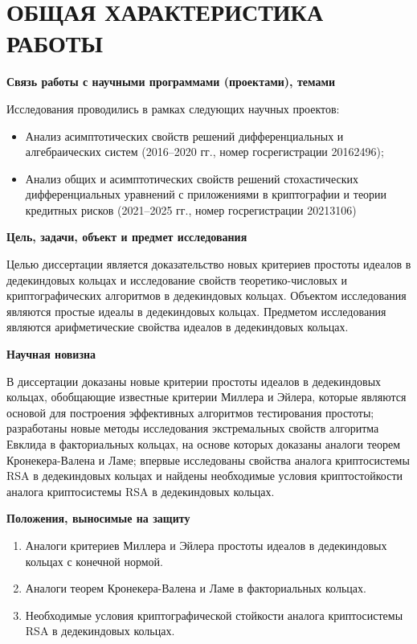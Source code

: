 \documentclass[_00_autoref.tex]{subfiles}
\begin{document}
{\let\clearpage\relax\vspace{2.2ex}
\chapter*{\MakeUppercase{ОБЩАЯ ХАРАКТЕРИСТИКА РАБОТЫ}}\vspace{-2ex}}

\medskip
\centerline{\textbf{Связь работы с научными программами (проектами), темами}}

Исследования проводились в рамках следующих научных проектов:
\begin{itemize}
    \item Анализ асимптотических свойств решений дифференциальных и алгебраических систем (2016--2020 гг., номер госрегистрации 20162496);

    \item Анализ общих и асимптотических свойств решений стохастических дифференциальных уравнений с приложениями в криптографии и теории кредитных рисков (2021--2025 гг., номер госрегистрации 20213106)
\end{itemize}

\pagebreak
\medskip
\centerline{\textbf{Цель, задачи, объект и предмет исследования}}

Целью диссертации является доказательство новых критериев простоты идеалов в дедекиндовых кольцах и исследование свойств теоретико-числовых и криптографических алгоритмов в дедекиндовых кольцах.
Объектом исследования являются простые идеалы в дедекиндовых кольцах.
Предметом исследования являются арифметические свойства идеалов в дедекиндовых кольцах.

\medskip
\centerline{\textbf{Научная новизна}}

В диссертации доказаны новые критерии простоты идеалов в дедекиндовых кольцах, обобщающие известные критерии Миллера и Эйлера, которые являются основой для построения эффективных алгоритмов тестирования простоты; разработаны новые методы исследования экстремальных свойств алгоритма Евклида в факториальных кольцах, на основе которых доказаны аналоги теорем Кронекера-Валена и Ламе; впервые исследованы свойства аналога криптосистемы RSA в дедекиндовых кольцах и найдены необходимые условия криптостойкости аналога криптосистемы RSA в дедекиндовых кольцах.

\medskip
\centerline{\textbf{Положения, выносимые на защиту}}

\begin{enumerate}
    \item Аналоги критериев Миллера и Эйлера простоты идеалов в дедекиндовых кольцах с конечной нормой.
    
    \item Аналоги теорем Кронекера-Валена и Ламе в факториальных кольцах.
    
    \item Необходимые условия криптографической стойкости аналога криптосистемы RSA в дедекиндовых кольцах.
\end{enumerate}
\end{document}
